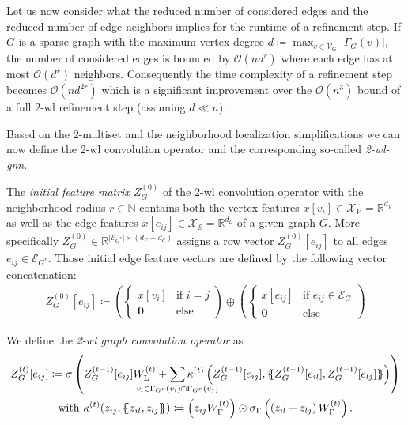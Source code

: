 \begin{enumerate}[label=\textbf{\arabic*.}]
		Let us now consider what the reduced number of considered edges and the reduced number of edge neighbors implies for the runtime of a refinement step.
		If $G$ is a sparse graph with the maximum vertex degree $d \coloneqq \max_{v \in \mathcal{V}_G} \left|\Gamma_G(v)\right|$, the number of considered edges is bounded by $\mathcal{O}(n d^r)$ where each edge has at most $\mathcal{O}(d^r)$ neighbors.
		Consequently the time complexity of a refinement step becomes $\mathcal{O}(n d^{2r})$ which is a significant improvement over the $\mathcal{O}(n^3)$ bound of a full 2-\acs{wl} refinement step (assuming $d \ll n$).
\end{enumerate}
Based on the 2-multiset and the neighborhood localization simplifications we can now define the 2-\ac{wl} convolution operator and the corresponding so-called \textit{2-\acs{wl}-\acs{gnn}}.
\begin{defn}\label{defn:ltd:wl2-conv-init}
	The \textit{initial feature matrix $Z_G^{(0)}$} of the 2-\acs{wl} convolution operator with the neighborhood radius $r \in \mathbb{N}$ contains both the vertex features $x[v_i] \in \mathcal{X}_{\mathcal{V}} = \mathbb{R}^{d_{\mathcal{V}}}$ as well as the edge features $x[e_{ij}] \in \mathcal{X}_{\mathcal{E}} = \mathbb{R}^{d_{\mathcal{E}}}$ of a given graph $G$.
	More specifically $Z_G^{(0)} \in \mathbb{R}^{{|\mathcal{E}_{G^r}|} \times (d_{\mathcal{V}} + d_{\mathcal{E}})}$ assigns a row vector $Z_G^{(0)}[e_{ij}]$ to all edges $e_{ij} \in \mathcal{E}_{G^r}$.
	Those initial edge feature vectors are defined by the following vector concatenation:
	\begin{align*}
		Z_G^{(0)}[e_{ij}] \coloneqq \left( \begin{cases}
			x[v_i] & \text{if $i = j$} \\
			\mathbf{0} & \text{else}
		\end{cases} \right) \oplus \left( \begin{cases}
			x[e_{ij}] & \text{if $e_{ij} \in \mathcal{E}_G$} \\
			\mathbf{0} & \text{else}
		\end{cases} \right)
	\end{align*}
\end{defn}
\begin{defn}\label{defn:ltd:wl2-conv-step}
	We define the \textit{2-\acs{wl} graph convolution operator} as
	\begin{gather*}
		Z_G^{(t)}[e_{ij}] \coloneqq \sigma\left( Z_G^{(t-1)}[e_{ij}] W_{\mathrm{L}}^{(t)} + \smashoperator[lr]{\sum_{v_l \in {\Gamma_{G^r}(v_i) \cap \Gamma_{G^r}(v_j)}}} \kappa^{(t)}\left( Z_G^{(t-1)}[e_{ij}], \ldblbrace Z_G^{(t-1)}[e_{il}], Z_G^{(t-1)}[e_{lj}] \rdblbrace \right) \right) \\
		\text{with } \kappa^{(t)}(z_{ij}, \ldblbrace z_{il}, z_{lj} \rdblbrace) \coloneqq \left( z_{ij} W_{\mathrm{F}}^{(t)} \right) \odot \sigma_{\Gamma}\left(\left( z_{il} + z_{lj} \right) W_{\Gamma}^{(t)} \right)
		\text{.}
	\end{gather*}
\end{defn}
